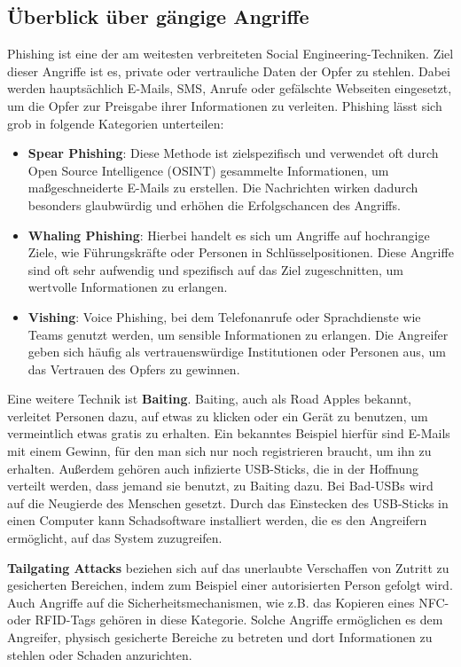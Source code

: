 \subsection{Überblick über gängige Angriffe}\label{subsec:uberblick-uber-gangige-angriffe}
Phishing ist eine der am weitesten verbreiteten Social Engineering-Techniken.
Ziel dieser Angriffe ist es, private oder vertrauliche Daten der Opfer zu stehlen.
Dabei werden hauptsächlich E-Mails, SMS, Anrufe oder gefälschte Webseiten eingesetzt, um die Opfer zur Preisgabe ihrer Informationen zu verleiten.
Phishing lässt sich grob in folgende Kategorien unterteilen\cite{advanced-social-engineering-attacks}:
\begin{itemize}
    \item \textbf{Spear Phishing}: Diese Methode ist zielspezifisch und verwendet oft durch Open Source Intelligence (OSINT) gesammelte Informationen, um maßgeschneiderte E-Mails zu erstellen.
     Die Nachrichten wirken dadurch besonders glaubwürdig und erhöhen die Erfolgschancen des Angriffs.
    \item \textbf{Whaling Phishing}: Hierbei handelt es sich um Angriffe auf hochrangige Ziele, wie Führungskräfte oder Personen in Schlüsselpositionen.
     Diese Angriffe sind oft sehr aufwendig und spezifisch auf das Ziel zugeschnitten, um wertvolle Informationen zu erlangen.
    \item \textbf{Vishing}: Voice Phishing, bei dem Telefonanrufe oder Sprachdienste wie Teams genutzt werden, um sensible Informationen zu erlangen.
     Die Angreifer geben sich häufig als vertrauenswürdige Institutionen oder Personen aus, um das Vertrauen des Opfers zu gewinnen.
\end{itemize}

Eine weitere Technik ist \textbf{Baiting}.
Baiting, auch als Road Apples bekannt, verleitet Personen dazu, auf etwas zu klicken oder ein Gerät zu benutzen, um vermeintlich etwas gratis zu erhalten.
Ein bekanntes Beispiel hierfür sind E-Mails mit einem Gewinn, für den man sich nur noch registrieren braucht, um ihn zu erhalten.
Außerdem gehören auch infizierte USB-Sticks, die in der Hoffnung verteilt werden, dass jemand sie benutzt, zu Baiting dazu.
Bei Bad-USBs wird auf die Neugierde des Menschen gesetzt.
Durch das Einstecken des USB-Sticks in einen Computer kann Schadsoftware installiert werden, die es den Angreifern ermöglicht, auf das System zuzugreifen.

\textbf{Tailgating Attacks} beziehen sich auf das unerlaubte Verschaffen von Zutritt zu gesicherten Bereichen, indem zum Beispiel einer autorisierten Person gefolgt wird.
Auch Angriffe auf die Sicherheitsmechanismen, wie z.B. das Kopieren eines NFC- oder RFID-Tags gehören in diese Kategorie.
Solche Angriffe ermöglichen es dem Angreifer, physisch gesicherte Bereiche zu betreten und dort Informationen zu stehlen oder Schaden anzurichten.

